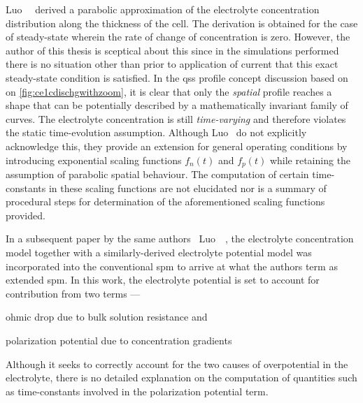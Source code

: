 Luo~\etal~\cite{Luo2013} derived  a parabolic  approximation of  the electrolyte
concentration  distribution along  the  thickness of  the  cell. The  derivation
is  obtained  for  the case  of  steady-state  wherein  the  rate of  change  of
concentration  is  zero.  However,  the  author  of  this  thesis  is  sceptical
about  this   since  in  the   simulations  performed  there  is   no  situation
other  than  prior  to  application  of current  that  this  exact  steady-state
condition is  satisfied. In  the \gls{qss} profile  concept discussion  based on
on \cref{fig:ce1cdischgwithzoom},  it  is  clear that  only  the  \emph{spatial}
profile reaches  a shape that can  be potentially described by  a mathematically
invariant   family   of  curves.   The   electrolyte   concentration  is   still
\emph{time-varying} and therefore violates the static time-evolution assumption.
Although  Luo~\etal{}  do  not  explicitly acknowledge  this,  they  provide  an
extension for  general operating  conditions by introducing  exponential scaling
functions  $f_n(t)$ and  $f_p(t)$ while  retaining the  assumption of  parabolic
spatial behaviour.  The computation of  certain time-constants in  these scaling
functions  are  not  elucidated  nor  is  a  summary  of  procedural  steps  for
determination of the aforementioned scaling functions provided.


In a subsequent paper by  the same authors \ie~Luo~\etal~\cite{Luo2013a}, the
electrolyte concentration  model together  with a  similarly-derived electrolyte
potential model  was incorporated into  the conventional \gls{spm} to  arrive at
what the authors term as extended \gls{spm}. In this work, the electrolyte
potential is set to account for contribution from two terms ---
\begin{enumerate*}[label=\emph{\alph*})]
    \item ohmic drop due to bulk solution resistance and
    \item polarization potential due to concentration gradients
\end{enumerate*}
Although it  seeks to correctly account  for the two causes  of overpotential in
the  electrolyte,  there  is  no  detailed explanation  on  the  computation  of
quantities such as time-constants involved in the polarization potential term.

